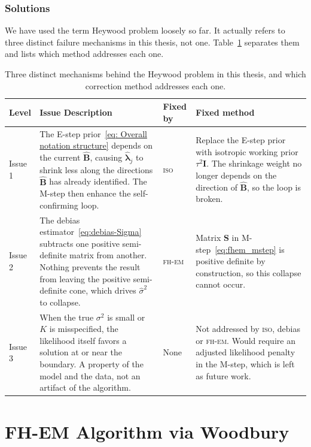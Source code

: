 \subsubsection{Solutions}

We have used the term Heywood problem loosely so far. It actually refers to three distinct failure mechanisms in this thesis, not one. Table~\ref{tab:heywood-levels} separates them and lists which method addresses each one.

\begin{table}[htbp]
\centering
\begin{tabular}{p{1.6cm}p{6.3cm}p{1.6cm}p{4.3cm}}
\toprule
Level & Issue Description & Fixed by & Fixed method \\
\midrule
Issue 1 & 
The E-step prior~\eqref{eq: Overall notation structure} depends on the current $\hat{\mathbf{B}}$, causing $\hat{\bm{\lambda}}_j$ to shrink less along the directions $\hat{\mathbf{B}}$ has already identified. The M-step then enhance the self-confirming loop. &
\textsc{iso} &
Replace the E-step prior with isotropic working prior $\tau^2\mathbf{I}$. The shrinkage weight no longer depends on the direction of $\hat{\mathbf{B}}$, so the loop is broken. \\
\addlinespace
Issue 2 &
The debias estimator~\eqref{eq:debias-Sigma} subtracts one positive semi-definite matrix from another. Nothing prevents the result from leaving the positive semi-definite cone, which drives $\hat\sigma^2$ to collapse. &
\textsc{fh-em} &
Matrix $\mathbf{S}$ in M-step~\eqref{eq:fhem_mstep} is positive definite by construction, so this collapse cannot occur. \\
\addlinespace
Issue 3 &
When the true $\sigma^2$ is small or $K$ is misspecified, the likelihood itself favors a solution at or near the boundary. A property of the model and the data, not an artifact of the algorithm. &
None &
Not addressed by \textsc{iso}, debias or \textsc{fh-em}. Would require an adjusted likelihood penalty in the M-step, which is left as future work. \\
\bottomrule
\end{tabular}
\caption{Three distinct mechanisms behind the Heywood problem in this thesis, and which correction method addresses each one.}
\label{tab:heywood-levels}
\end{table}

\iffalse
\section{FH-EM Algorithm via Woodbury}

